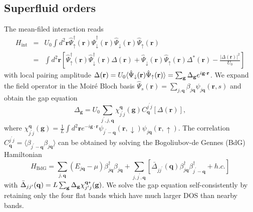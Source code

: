 \documentclass[twocolumn,english,prl,floatfix,citeautoscript,nofootinbib]{revtex4}
\begin{document}
\begin{widetext}
\subsection{Superfluid orders}

The mean-filed interaction reads
\begin{eqnarray}
H_{\text{int}} &=&U_{0}\int d^{2}\mathbf{r}\hat{\Psi}_{\uparrow }^{\dag }(%
\mathbf{r})\hat{\Psi}_{\downarrow }^{\dag }(\mathbf{r})\hat{\Psi}%
_{\downarrow }(\mathbf{r})\hat{\Psi}_{\uparrow }(\mathbf{r})  \nonumber \\
&=&\int d^{2}\mathbf{r}[\hat{\Psi}_{\uparrow }^{\dag }(\mathbf{r})\hat{\Psi}%
_{\downarrow }^{\dag }(\mathbf{r})\Delta (\mathbf{r})+\hat{\Psi}_{\downarrow
}(\mathbf{r})\hat{\Psi}_{\uparrow }(\mathbf{r})\Delta ^{\ast }(\mathbf{r})-%
\frac{|\Delta (\mathbf{r})|^{2}}{U_{0}}]
\end{eqnarray}%
with local pairing amplitude $\Delta (\mathbf{r})=U_{0}\langle \hat{\Psi}%
_{\downarrow }(\mathbf{r})\hat{\Psi}_{\uparrow }(\mathbf{r})\rangle =\sum_{%
\mathbf{g}}\Delta _{\mathbf{g}}e^{i\mathbf{g}\cdot \mathbf{r}}$. We expand
the field operator in the Moir\'{e} Bloch basis $\hat{\Psi}_{s}(\mathbf{r}%
)=\sum_{j,\mathbf{q}}\beta _{j\mathbf{q}}\psi _{j\mathbf{q}}(\mathbf{r},s)$
and obtain the gap equation
\begin{equation}
\Delta _{\mathbf{g}}=U_{0}\sum_{j^{\prime },j,\mathbf{q}}\chi _{j^{\prime
}j}^{\mathbf{q}}(\mathbf{g})C_{\mathbf{q}}^{j^{\prime }j}[\Delta (\mathbf{r}%
)],  \label{eq:GapS}
\end{equation}%
where $\chi _{j^{\prime }j}^{\mathbf{q}}(\mathbf{g})=\frac{1}{L}\int d^{2}%
\mathbf{r}e^{-i\mathbf{g}\cdot \mathbf{r}}\psi _{j^{\prime }-\mathbf{q}}(%
\mathbf{r},\downarrow )\psi _{j\mathbf{q}}(\mathbf{r},\uparrow )$. The
correlation $C_{\mathbf{q}}^{j^{\prime }j}=\langle \beta _{j^{\prime }-%
\mathbf{q}}\beta _{j\mathbf{q}}\rangle $ can be obtained by solving the
Bogoliubov-de Gennes (BdG) Hamiltonian%
\begin{equation}
H_{\text{BdG}}=\sum_{j,\mathbf{q}}(E_{j\mathbf{q}}-\mu)\beta _{j\mathbf{q}}^{\dag
}\beta _{j\mathbf{q}}+\sum_{j,j^{\prime },\mathbf{q}}[\bar{\Delta}%
_{jj^{\prime }}(\mathbf{q})\beta _{j\mathbf{q}}^{\dag }\beta _{j^{\prime }-%
\mathbf{q}}^{\dag }+h.c.]
\end{equation}%
with $\bar{\Delta}_{jj^{\prime }}(\mathbf{q})=L\sum_{\mathbf{g}}\Delta _{%
\mathbf{g}}\chi _{j^{\prime }j}^{\mathbf{q}\ast }(\mathbf{g})$. We solve the
gap equation self-consistently by retaining only the four flat bands which
have much larger DOS than nearby bands.


\end{widetext}
\end{document}
